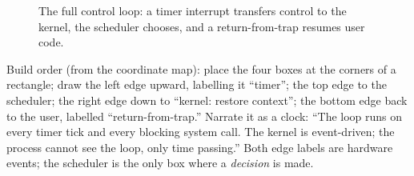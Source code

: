 \documentclass[11pt]{article}
\begin{document}
\begin{figure}[h]
  \centering
  \caption{The full control loop: a timer interrupt transfers control to the kernel, the scheduler chooses, and a return-from-trap resumes user code.}
  \label{fig:control-loop}
\end{figure}

Build order (from the coordinate map): place the four boxes at the corners of a rectangle; draw the left edge upward, labelling it ``timer''; the top edge to the scheduler; the right edge down to ``kernel: restore context''; the bottom edge back to the user, labelled ``return-from-trap.'' Narrate it as a clock: ``The loop runs on every timer tick and every blocking system call. The kernel is event-driven; the process cannot see the loop, only time passing.'' Both edge labels are hardware events; the scheduler is the only box where a \emph{decision} is made.
\end{document}
